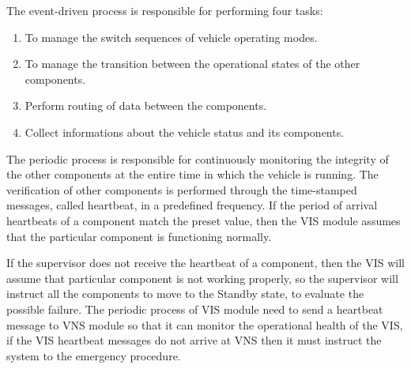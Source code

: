 \documentclass[conference]{IEEEtran}
\begin{document}
The event-driven process is responsible for performing four tasks:
\begin{enumerate}
	\item To manage the switch sequences of vehicle operating modes.
	\item To manage the transition between the operational states of the other components.
	\item Perform routing of data between the components.
	\item Collect informations about the vehicle status and its components.
\end{enumerate}

The periodic process is responsible for continuously monitoring the integrity of the other components at the entire time in which the vehicle is running. The verification of other components is performed through the time-stamped messages, called heartbeat, in a predefined frequency. If the period of arrival heartbeats of a component match the preset value, then the VIS module assumes that the particular component is functioning normally.

If the supervisor does not receive the heartbeat of a component, then the VIS will assume that particular component is not working properly, so the supervisor will instruct all the components to move to the Standby state, to evaluate the possible failure. The periodic process of VIS module need to send a heartbeat message to VNS module so that it can monitor the operational health of the VIS, if the VIS heartbeat messages do not arrive at VNS then it must instruct the system to the emergency procedure.


\end{document}
